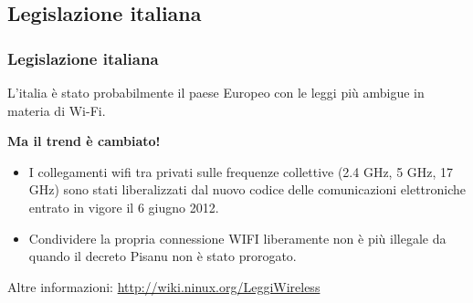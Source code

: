 \documentclass{beamer}
\begin{document}
\subsection{Legislazione italiana}
\begin{frame}\frametitle{Legislazione italiana}
L'italia è stato probabilmente il paese Europeo con le leggi più ambigue in materia di Wi-Fi.

\vspace{10pt}
\textbf{Ma il trend è cambiato!}

\begin{itemize}
 \item I collegamenti wifi tra privati sulle frequenze collettive (2.4 GHz, 5 GHz, 17 GHz) sono stati liberalizzati dal nuovo codice delle comunicazioni elettroniche entrato in vigore il 6 giugno 2012.
 \item Condividere la propria connessione WIFI liberamente non è più illegale da quando il decreto Pisanu non è stato prorogato.
\end{itemize}
Altre informazioni: \url{http://wiki.ninux.org/LeggiWireless}
\end{frame}

\logo{}
\end{document}
